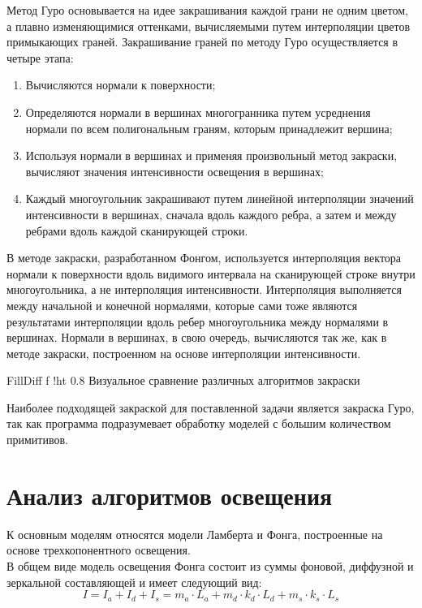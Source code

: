 Метод Гуро основывается на идее закрашивания каждой грани не одним цветом, а плавно изменяющимися оттенками, вычисляемыми путем интерполяции цветов примыкающих граней. Закрашивание граней по методу Гуро осуществляется в четыре этапа:

\begin{enumerate}
	\item Вычисляются нормали к поверхности;
	\item Определяются нормали в вершинах многогранника путем усреднения нормали по всем полигональным граням, которым принадлежит вершина;
	\item Используя нормали в вершинах и применяя произвольный метод закраски, вычисляют значения интенсивности освещения в вершинах;
	\item Каждый многоугольник закрашивают путем линейной интерполяции значений интенсивности в вершинах, сначала вдоль каждого ребра, а затем и между ребрами вдоль каждой сканирующей строки.
\end{enumerate}

\leavevmode

В методе закраски, разработанном Фонгом, используется интерполяция вектора нормали к поверхности вдоль видимого интервала на сканирующей строке внутри многоугольника, а не интерполяция интенсивности. Интерполяция выполняется между начальной и конечной нормалями, которые сами тоже являются результатами интерполяции вдоль ребер многоугольника между нормалями в вершинах. Нормали в вершинах, в свою очередь, вычисляются так же, как в методе закраски, построенном на основе интерполяции интенсивности. \cite{FILL_FACES}

{FillDiff}
{f}
{!ht}
{0.8\textwidth}
{Визуальное сравнение различных алгоритмов закраски}

Наиболее подходящей закраской для поставленной задачи является закраска Гуро, так как программа подразумевает обработку моделей с большим количеством примитивов.

\newpage

\section{Анализ алгоритмов освещения}

К основным моделям относятся модели Ламберта и Фонга, построенные на основе трехкопонентного освещения.\\

В общем виде модель освещения Фонга состоит из суммы фоновой, диффузной и зеркальной составляющей и имеет следующий вид:
\begin{equation}
	I = I_{a} + I_{d} + I_{s} = m_{a} \cdot L_{a} + m_{d} \cdot k_{d} \cdot L_{d} + m_{s} \cdot k_{s} \cdot L_{s}
\end{equation}

